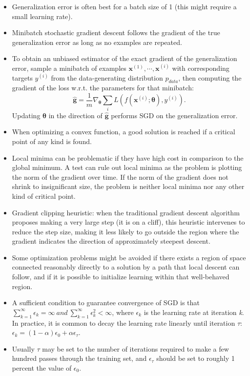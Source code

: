 \documentclass{article}
\begin{document}
\begin{itemize}
\item Generalization error is often best for a batch size of 1 (this might require a small learning rate).
\item Minibatch stochastic gradient descent follows the gradient of the true generalization error as long as no examples are repeated.
\item To obtain an unbiased estimator of the exact gradient of the generalization error, sample a minibatch of examples {\(\boldsymbol{x}^{(1)}, \cdots, \boldsymbol{x}^{(i)}\)} with corresponding targets \(y^{(i)}\) from the data-generating distribution \(p_{data}\), then computing the gradient of the loss w.r.t. the parameters for that minibatch:
\[
	\hat{\boldsymbol{g}} = \frac{1}{m}\nabla_{\boldsymbol{\theta}}\sum_i L(f(\boldsymbol{x}^{(i)}; \boldsymbol{\theta}), y^{(i)}).
\]
Updating \(\boldsymbol{\theta}\) in the direction of \(\hat{\boldsymbol{g}}\) performs SGD on the generalization error.
\item When optimizing a convex function, a good solution is reached if a critical point of any kind is found.
\item Local minima can be problematic if they have high cost in comparison to the global minimum. A test can rule out local minima as the problem is plotting the norm of the gradient over time. If the norm of the gradient does not shrink to insignificant size, the problem is neither local minima nor any other kind of critical point.
\item Gradient clipping heuristic: when the traditional gradient descent algorithm proposes making a very large step (it is on a cliff), this heuristic intervenes to reduce the step size, making it less likely to go outside the region where the gradient indicates the direction of approximately steepest descent.
\item Some optimization problems might be avoided if there exists a region of space connected reasonably directly to a solution by a path that local descent can follow, and if it is possible to initialize learning within that well-behaved region.
\item A sufficient condition to guarantee convergence of SGD is that \(\sum^{\infty}_{k = 1}\epsilon_k = \infty\ and\ \sum^{\infty}_{k = 1}\epsilon^2_k < \infty\), where \(\epsilon_k\) is the learning rate at iteration \textit{k}. In practice, it is common to decay the learning rate linearly until iteration \(\tau\): \(\epsilon_k = (1 - \alpha)\epsilon_0 + \alpha\epsilon_\tau\). 
\item Usually \(\tau\) may be set to the number of iterations required to make a few hundred passes through the training set, and \(\epsilon_\tau\) should be set to roughly 1 percent the value of \(\epsilon_0\).

\end{itemize}
\end{document}
